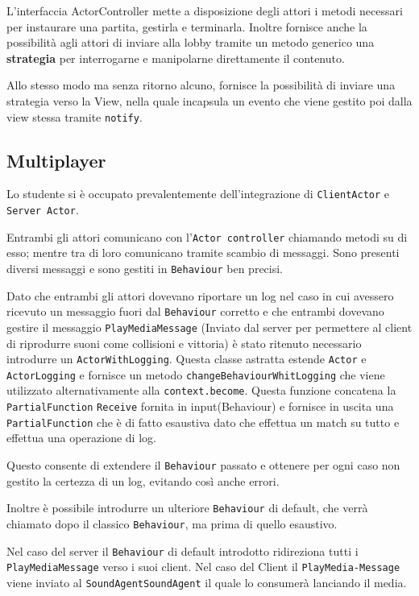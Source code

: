         L'interfaccia ActorController mette a disposizione degli attori i metodi necessari per instaurare una partita, gestirla e terminarla.
        Inoltre fornisce anche la possibilità agli attori di inviare alla lobby tramite un metodo generico una \textbf{strategia} per interrogarne e manipolarne direttamente il contenuto.
        
        Allo stesso modo ma senza ritorno alcuno, fornisce la possibilità di inviare una strategia verso la View, nella quale incapsula un evento che viene gestito poi dalla view stessa tramite \texttt{notify}.  
        
        
    \subsection{Multiplayer}
    Lo studente si è occupato prevalentemente dell'integrazione di \texttt{ClientActor} e \texttt{Server Actor}.
    
    Entrambi gli attori comunicano con l'\texttt{Actor controller} chiamando metodi su di esso; mentre tra di loro comunicano tramite scambio di messaggi. Sono presenti diversi messaggi e sono gestiti in \texttt{Behaviour} ben precisi.
    
    Dato che entrambi gli attori dovevano riportare un log nel caso in cui avessero ricevuto un messaggio fuori dal \texttt{Behaviour} corretto e che entrambi dovevano gestire il messaggio \texttt{PlayMediaMessage} (Inviato dal server per permettere al client di riprodurre suoni come collisioni e vittoria) è stato ritenuto necessario introdurre un \texttt{ActorWithLogging}. Questa classe astratta estende \texttt{Actor} e \texttt{ActorLogging} e fornisce un metodo \texttt{changeBehaviourWhitLogging} che viene utilizzato alternativamente alla \texttt{context.become}. Questa funzione concatena la \texttt{PartialFunction} \texttt{Receive} fornita in input(Behaviour) e fornisce in uscita una \texttt{PartialFunction} che è di fatto esaustiva dato che effettua un match su tutto e 
    effettua una operazione di log.
    
    Questo consente di extendere il \texttt{Behaviour} passato e ottenere per ogni caso non gestito la certezza di un log, evitando così anche errori.
    
    Inoltre è possibile introdurre un ulteriore \texttt{Behaviour} di default, che verrà chiamato dopo il classico \texttt{Behaviour}, ma prima di quello esaustivo.
    
    Nel caso del server il \texttt{Behaviour} di default introdotto ridireziona tutti i \texttt{PlayMediaMessage} verso i suoi client.
    Nel caso del Client il \texttt{PlayMedia-Message} viene inviato al \texttt{SoundAgentSoundAgent} il quale lo consumerà lanciando il media.

